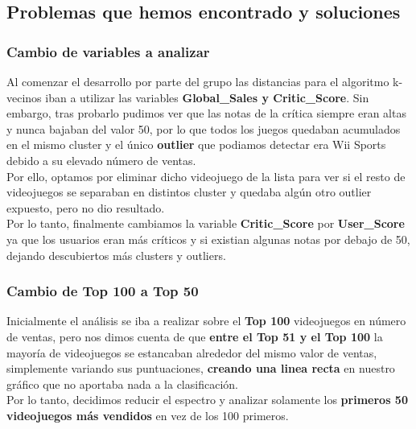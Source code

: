 \documentclass [a4paper] {article}
\begin{document}
\subsection{Problemas que hemos encontrado y soluciones}
\subsubsection{Cambio de variables a analizar}

Al comenzar el desarrollo por parte del grupo las distancias para el algoritmo k-vecinos iban a utilizar las variables
\textbf{Global\_Sales y Critic\_Score}. Sin embargo, tras probarlo pudimos ver que las notas de la crítica siempre eran altas
y nunca bajaban del valor 50, por lo que todos los juegos quedaban acumulados en el mismo cluster y el único \textbf{outlier}
que podiamos detectar era Wii Sports debido a su elevado número de ventas.\\
Por ello, optamos por eliminar dicho videojuego de la lista para ver si el resto de videojuegos se separaban en distintos 
cluster y quedaba algún otro outlier expuesto, pero no dio resultado.\\
Por lo tanto, finalmente cambiamos la variable \textbf{Critic\_Score} por \textbf{User\_Score} ya que los usuarios eran más críticos
y si existian algunas notas por debajo de 50, dejando descubiertos más clusters y outliers.

\subsubsection{Cambio de Top 100 a Top 50}

Inicialmente el análisis se iba a realizar sobre el \textbf{Top 100} videojuegos en número de ventas, pero nos dimos cuenta de que
\textbf{entre el Top 51 y el Top 100} la mayoría de videojuegos se estancaban alrededor del mismo valor de ventas, simplemente variando sus 
puntuaciones, \textbf{creando una linea recta} en nuestro gráfico que no aportaba nada a la clasificación.\\
Por lo tanto, decidimos reducir el espectro y analizar solamente los \textbf{primeros 50 videojuegos más vendidos} en vez de los 
100 primeros.
\end{document}
